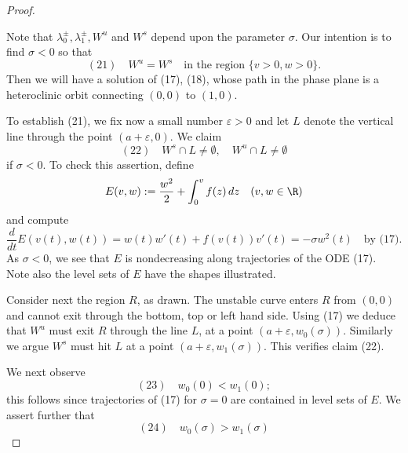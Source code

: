 \begin{proof}
\begin{figure}[h]\centering
\end{figure}

Note that $\lambda_0^{\pm}, \lambda_1^{\pm}, W^u$ and $W^s$ depend upon the parameter $\sigma$. Our intention is to find $\sigma < 0$ so that
$$(21) \quad W^u = W^s \quad \text{in the region } \{v>0, w>0\}.$$
Then we will have a solution of (17), (18), whose path in the phase plane is a heteroclinic orbit connecting $(0,0)$ to $(1,0)$.

To establish (21), we fix now a small number $\varepsilon > 0$ and let $L$ denote the vertical line through the point $(a+\varepsilon, 0)$. We claim
$$(22) \quad W^s \cap L \neq \emptyset, \quad W^u \cap L \neq \emptyset$$
if $\sigma < 0$. To check this assertion, define
$$E(v,w) := \frac{w^2}{2} + \int_0^v f(z)\,dz \quad (v,w\in\R)$$
and compute
$$\frac{d}{dt}E(v(t),w(t)) = w(t)w'(t) + f(v(t))v'(t) = -\sigma w^2(t) \quad \text{by (17)}.$$
As $\sigma < 0$, we see that $E$ is nondecreasing along trajectories of the ODE (17). Note also the level sets of $E$ have the shapes illustrated.

\begin{figure}[h]\centering
\end{figure}

Consider next the region $R$, as drawn. The unstable curve enters $R$ from $(0,0)$ and cannot exit through the bottom, top or left hand side. Using (17) we deduce that $W^u$ must exit $R$ through the line $L$, at a point $(a+\varepsilon, w_0(\sigma))$. Similarly we argue $W^s$ must hit $L$ at a point $(a+\varepsilon, w_1(\sigma))$. This verifies claim (22).

We next observe
$$(23) \quad w_0(0) < w_1(0);$$
this follows since trajectories of (17) for $\sigma=0$ are contained in level sets of $E$. We assert further that
$$(24) \quad w_0(\sigma) > w_1(\sigma)$$


\end{proof}

